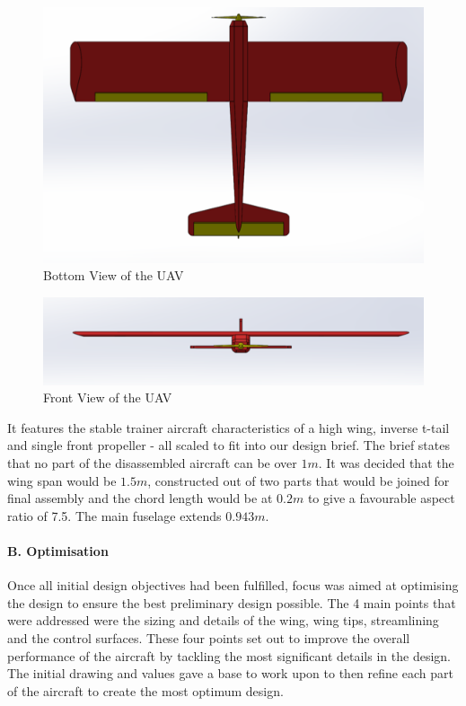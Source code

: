 \documentclass[12pt]{article}
\begin{document}
\begin{figure}[h!]
    \includegraphics[width=14.5cm]{bottom.png}
    \caption{Bottom View of the UAV}
\end{figure}

\begin{figure}[h!]
    \includegraphics[width=14.5cm]{front.png}
    \caption{Front View of the UAV}
\end{figure}

\noindent It features the stable trainer aircraft characteristics of a high wing, inverse t-tail and single front propeller - all scaled to fit into our design brief. The brief states that no part of the disassembled aircraft can be over $1m$. It was decided that the wing span would be $1.5 m$, constructed out of two parts that would be joined for final assembly and the chord length would be at $0.2m$ to give a favourable aspect ratio of 7.5. The main fuselage extends $0.943m$. \\

\paragraph{B. Optimisation} Once all initial design objectives had been fulfilled, focus was aimed at optimising the design to ensure the best preliminary design possible. The 4 main points that were addressed were the sizing and details of the wing, wing tips, streamlining and the control surfaces. These four points set out to improve the overall performance of the aircraft by tackling the most significant details in the design. The initial drawing and values gave a base to work upon to then refine each part of the aircraft to create the most optimum design. \\
\end{document}
